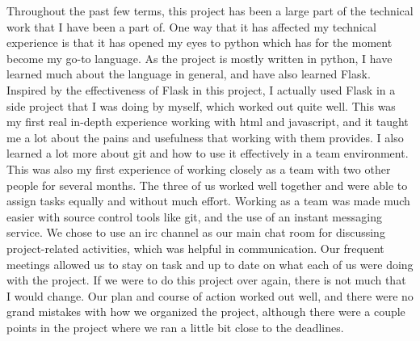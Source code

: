 Throughout the past few terms, this project has been a large part of the technical work that I have been a part of. One way that it has affected my technical experience is that it has opened my eyes to python which has for the moment become my go-to language. As the project is mostly written in python, I have learned much about the language in general, and have also learned Flask. Inspired by the effectiveness of Flask in this project, I actually used Flask in a side project that I was doing by myself, which worked out quite well. This was my first real in-depth experience working with html and javascript, and it taught me a lot about the pains and usefulness that working with them provides. I also learned a lot more about git and how to use it effectively in a team environment.
This was also my first experience of working closely as a team with two other people for several months. The three of us worked well together and were able to assign tasks equally and without much effort. Working as a team was made much easier with source control tools like git, and the use of an instant messaging service. We chose to use an irc channel as our main chat room for discussing project-related activities, which was helpful in communication. Our frequent meetings allowed us to stay on task and up to date on what each of us were doing with the project. 
If we were to do this project over again, there is not much that I would change. Our plan and course of action worked out well, and there were no grand mistakes with how we organized the project, although there were a couple points in the project where we ran a little bit close to the deadlines.